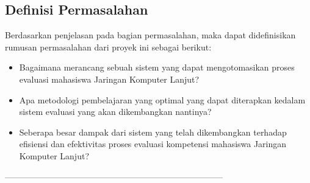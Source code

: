 \subsection{Definisi Permasalahan}
\label{sec:definisiMasalah}
Berdasarkan penjelasan pada bagian permasalahan, maka dapat didefinisikan rumusan permasalahan dari proyek ini sebagai berikut:
\begin{itemize}
	\item Bagaimana merancang sebuah sistem yang dapat mengotomasikan proses evaluasi mahasiswa Jaringan Komputer Lanjut?
	\item Apa metodologi pembelajaran yang optimal yang dapat diterapkan kedalam sistem evaluasi yang akan dikembangkan nantinya?
	\item Seberapa besar dampak dari sistem yang telah dikembangkan terhadap efisiensi dan efektivitas proses evaluasi kompetensi mahasiswa Jaringan Komputer Lanjut?
\end{itemize}
-----------------------------------------------------------------------------%
